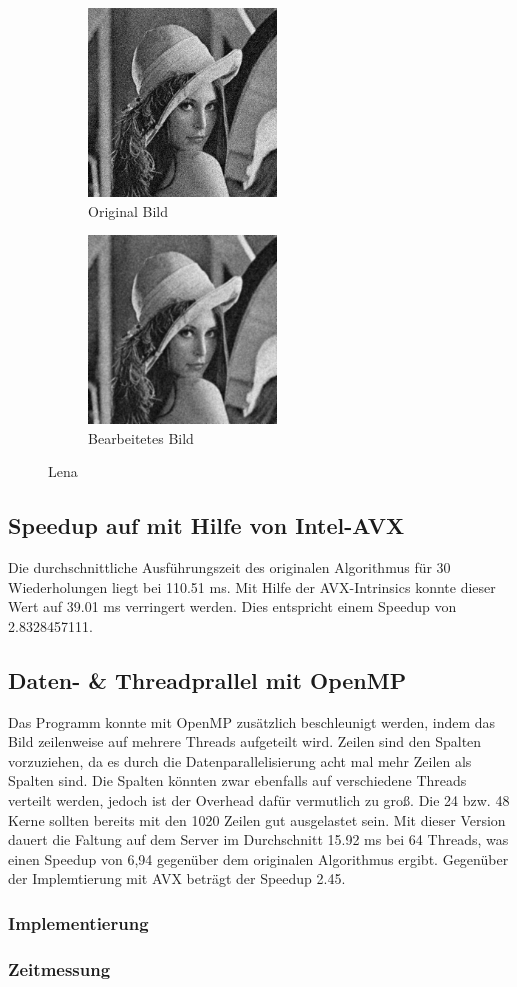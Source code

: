 \documentclass[12pt,a4paper]{article}
\begin{document}
\begin{figure}[h]
  \begin{subfigure}{0.5\textwidth}
    \includegraphics[width=0.9\linewidth, height=5cm]{../lena.jpg}
    \caption{Original Bild}
    \label{fig:subLena1}
  \end{subfigure}
  \begin{subfigure}{0.5\textwidth}
    \includegraphics[width=0.9\linewidth, height=5cm]{../lenaout.jpg}
    \caption{Bearbeitetes Bild}
    \label{fig:subLena2}
  \end{subfigure}
  \caption{Lena}
  \label{fig:Lena}
\end{figure}

\subsection{Speedup auf mit Hilfe von Intel-AVX}
Die durchschnittliche Ausführungszeit des originalen Algorithmus für 30 Wiederholungen liegt bei 110.51 ms. Mit Hilfe der AVX-Intrinsics konnte dieser Wert auf 39.01 ms verringert werden. Dies entspricht einem Speedup von 2.8328457111.
\subsection{Daten- \& Threadprallel mit OpenMP}
Das Programm konnte mit OpenMP zusätzlich beschleunigt werden, indem das Bild zeilenweise auf mehrere Threads aufgeteilt wird. Zeilen sind den Spalten vorzuziehen, da es durch die Datenparallelisierung acht mal mehr Zeilen als Spalten sind. Die Spalten könnten zwar ebenfalls auf verschiedene Threads verteilt werden, jedoch ist der Overhead dafür vermutlich zu groß. Die 24 bzw. 48 Kerne sollten bereits mit den 1020 Zeilen gut ausgelastet sein. Mit dieser Version dauert die Faltung auf dem Server im Durchschnitt 15.92 ms bei 64 Threads, was einen Speedup von 6,94 gegenüber dem originalen Algorithmus ergibt. Gegenüber der Implemtierung mit AVX beträgt der Speedup 2.45.
\subsubsection{Implementierung}

\subsubsection{Zeitmessung}

\end{document}
